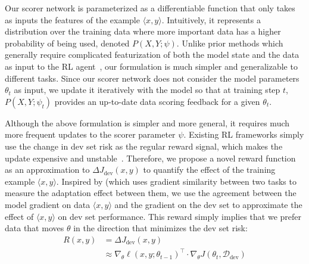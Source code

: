 Our scorer network is parameterized as a differentiable function that only takes as inputs the features of the example $\langle x, y \rangle$. Intuitively, it represents a distribution over the training data where more important data has a higher probability of being used, denoted $P(X, Y; \psi)$. Unlike prior methods which generally require complicated featurization of both the model state and the data as input to the RL agent~\citep{learn_to_teach,mentornet,learn_active_learn}, our formulation is much simpler and  generalizable to different tasks. Since our scorer network does not consider the model parameters $\theta_t$ as input, we update it iteratively with the model so that at training step $t$, $P(X, Y; \psi_t)$ provides an up-to-date data scoring feedback for a given $\theta_t$. %

Although the above formulation is simpler and more general, it requires much more frequent updates to the scorer parameter $\psi$. Existing RL frameworks simply use the change in dev set risk as the regular reward signal, which makes the update expensive and unstable~\citep{learn_to_teach,rl_nmt}. Therefore, we propose a novel reward function as an approximation to $\Delta J_{\text{dev}}(x, y)$ to quantify the effect of the training example $\langle x, y \rangle$. Inspired by \citet{cos_sim} (which uses gradient similarity between two tasks to measure the adaptation effect between them, we use the agreement between the model gradient on data $\langle x, y \rangle$ and the gradient on the dev set to approximate the effect of $\langle x, y \rangle$ on dev set performance. This reward simply implies that we prefer data that moves $\theta$ in the direction that minimizes the dev set risk: 
\begin{equation}
    \label{eqn:reward_fn}
\begin{align}
     R(x, y) & = \Delta J_{\text{dev}}(x, y) \\
    & \approx \nabla_\theta \ell(x, y; \theta_{t-1})^\top \cdot \nabla_\theta J(\theta_t, \mathcal{D}_\text{dev}) 
\end{align}
\end{equation}

